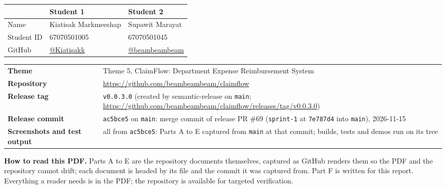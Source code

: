 \thispagestyle{plain}
\reporttitle

\medskip
\begin{center}
\begin{tabular}{@{}lll@{}}
\toprule
 & \textbf{Student 1} & \textbf{Student 2} \\ \midrule
Name & Kiatisak Markmeeshap & Supawit Marayat \\
Student ID & 67070501005 & 67070501045 \\
GitHub & \href{https://github.com/Kiatisakk}{@Kiatisakk} & \href{https://github.com/beambeambeam}{@beambeambeam} \\
\bottomrule
\end{tabular}
\end{center}

\begin{tabular}{@{}p{3.4cm}p{13cm}@{}}
\textbf{Theme} & Theme 5, ClaimFlow: Department Expense Reimbursement System \\
\textbf{Repository} & \url{https://github.com/beambeambeam/claimflow} \\
\textbf{Release tag} & \texttt{v0.0.3.0} (created by semantic-release on \texttt{main}; \url{https://github.com/beambeambeam/claimflow/releases/tag/v0.0.3.0}) \\
\textbf{Release commit} & \texttt{ac5bce5} on \texttt{main}: merge commit of release PR \#69 (\texttt{sprint-1} at \texttt{7e787d4} into \texttt{main}), 2026-11-15 \\
\textbf{Screenshots and test output} & all from \texttt{ac5bce5}: Parts A to E captured from \texttt{main} at that commit; builds, tests and demos run on its tree \\
\end{tabular}

\medskip
\noindent\textbf{How to read this PDF.}
Parts A to E are the repository documents themselves, captured as GitHub renders them so the PDF and the repository cannot drift;
each document is headed by its file and the commit it was captured from.
Part F is written for this report.
Everything a reader needs is in the PDF; the repository is available for targeted verification.

\clearpage

